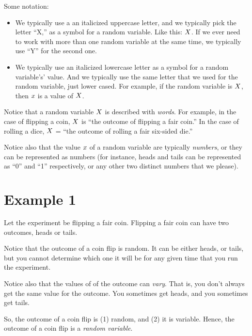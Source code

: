 \documentclass[../../../main.tex]{subfiles}
\begin{document}
\noindent
Some notation:

\begin{itemize}

  \item We typically use a an italicized uppercase letter, and we typically pick the letter ``X,'' as a symbol for a random variable. Like this: $\RandVar/$. If we ever need to work with more than one random variable at the same time, we typically use ``Y'' for the second one.

  \item We typically use an italicized lowercase letter as a symbol for a random variable's' value. And we typically use the same letter that we used for the random variable, just lower cased. For example, if the random variable is $\RandVar/$, then $\RandVarVal/$ is a value of $\RandVar/$. 

\end{itemize}

\noindent
Notice that a random variable $\RandVar/$ is described with \emph{words}. For example, in the case of flipping a coin, $\RandVar/$ is ``the outcome of flipping a fair coin.'' In the case of rolling a dice, $\RandVar/$ = ``the outcome of rolling a fair six-sided die.'' 

Notice also that the value $\RandVarVal/$ of a random variable are typically \emph{numbers}, or they can be represented as numbers (for instance, heads and tails can be represented as ``0'' and ``1'' respectively, or any other two distinct numbers that we please).


\section{Example 1}

Let the experiment be flipping a fair coin. Flipping a fair coin can have two outcomes, heads or tails.

Notice that the outcome of a coin flip is random. It can be either heads, or tails, but you cannot determine which one it will be for any given time that you run the experiment. 

Notice also that the values of of the outcome can \emph{vary}. That is, you don't always get the same value for the outcome. You sometimes get heads, and you sometimes get tails.

So, the outcome of a coin flip is (1) random, and (2) it is variable. Hence, the outcome of a coin flip is a \emph{random variable}. 
\end{document}
